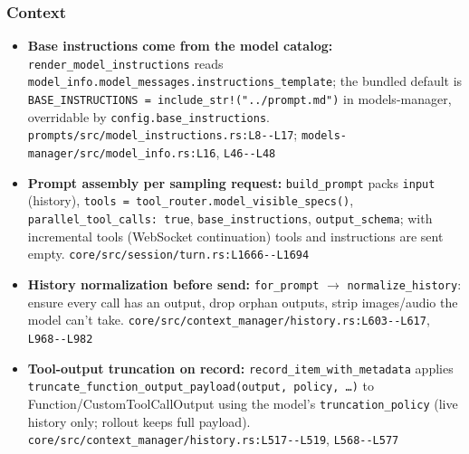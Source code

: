 \subsubsection*{Context}
\begin{itemize}
\item \textbf{Base instructions come from the model catalog:} \texttt{render\_\allowbreak{}model\_\allowbreak{}instructions} reads \texttt{model\_\allowbreak{}info.\allowbreak{}model\_\allowbreak{}messages.\allowbreak{}instructions\_\allowbreak{}template}; the bundled default is \texttt{BASE\_\allowbreak{}INSTRUCTIONS = include\_\allowbreak{}str!(\allowbreak{}".\allowbreak{}.\allowbreak{}/\allowbreak{}prompt.\allowbreak{}md")} in models-manager, overridable by \texttt{config.\allowbreak{}base\_\allowbreak{}instructions}. \texttt{prompts/\allowbreak{}src/\allowbreak{}model\_\allowbreak{}instructions.\allowbreak{}rs:\allowbreak{}L8-\allowbreak{}-\allowbreak{}L17}; \texttt{models-\allowbreak{}manager/\allowbreak{}src/\allowbreak{}model\_\allowbreak{}info.\allowbreak{}rs:\allowbreak{}L16}, \texttt{L46-\allowbreak{}-\allowbreak{}L48}
\item \textbf{Prompt assembly per sampling request:} \texttt{build\_\allowbreak{}prompt} packs \texttt{input} (history), \texttt{tools = tool\_\allowbreak{}router.\allowbreak{}model\_\allowbreak{}visible\_\allowbreak{}specs(\allowbreak{})}, \texttt{parallel\_\allowbreak{}tool\_\allowbreak{}calls:\allowbreak{} true}, \texttt{base\_\allowbreak{}instructions}, \texttt{output\_\allowbreak{}schema}; with incremental tools (WebSocket continuation) tools and instructions are sent empty. \texttt{core/\allowbreak{}src/\allowbreak{}session/\allowbreak{}turn.\allowbreak{}rs:\allowbreak{}L1666-\allowbreak{}-\allowbreak{}L1694}
\item \textbf{History normalization before send:} \texttt{for\_\allowbreak{}prompt} $\rightarrow$ \texttt{normalize\_\allowbreak{}history}: ensure every call has an output, drop orphan outputs, strip images/audio the model can't take. \texttt{core/\allowbreak{}src/\allowbreak{}context\_\allowbreak{}manager/\allowbreak{}history.\allowbreak{}rs:\allowbreak{}L603-\allowbreak{}-\allowbreak{}L617}, \texttt{L968-\allowbreak{}-\allowbreak{}L982}
\item \textbf{Tool-output truncation on record:} \texttt{record\_\allowbreak{}item\_\allowbreak{}with\_\allowbreak{}metadata} applies \texttt{truncate\_\allowbreak{}function\_\allowbreak{}output\_\allowbreak{}payload(\allowbreak{}output, policy, \ldots{})} to Function/CustomToolCallOutput using the model's \texttt{truncation\_\allowbreak{}policy} (live history only; rollout keeps full payload). \texttt{core/\allowbreak{}src/\allowbreak{}context\_\allowbreak{}manager/\allowbreak{}history.\allowbreak{}rs:\allowbreak{}L517-\allowbreak{}-\allowbreak{}L519}, \texttt{L568-\allowbreak{}-\allowbreak{}L577}

\end{itemize}
